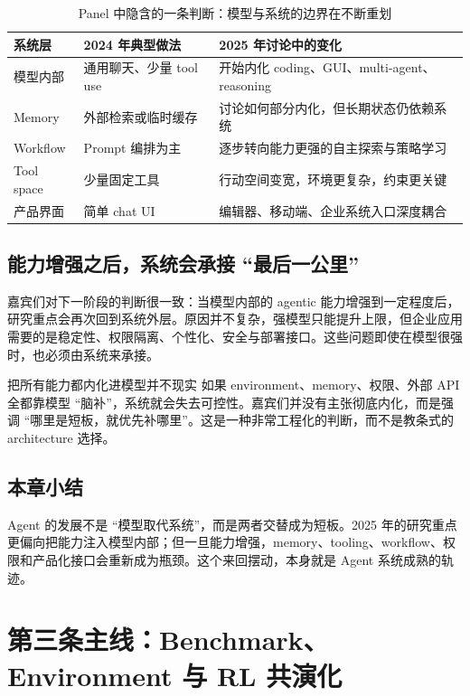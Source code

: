 \documentclass[a4paper]{article}
\begin{document}
\begin{table}[H]
\centering
\begin{tabular}{p{3.0cm}p{4.3cm}p{4.3cm}}
\toprule
\textbf{系统层} & \textbf{2024 年典型做法} & \textbf{2025 年讨论中的变化} \\
\midrule
模型内部 & 通用聊天、少量 tool use & 开始内化 coding、GUI、multi-agent、reasoning \\
Memory & 外部检索或临时缓存 & 讨论如何部分内化，但长期状态仍依赖系统 \\
Workflow & Prompt 编排为主 & 逐步转向能力更强的自主探索与策略学习 \\
Tool space & 少量固定工具 & 行动空间变宽，环境更复杂，约束更关键 \\
产品界面 & 简单 chat UI & 编辑器、移动端、企业系统入口深度耦合 \\
\bottomrule
\end{tabular}
\caption{Panel 中隐含的一条判断：模型与系统的边界在不断重划}
\end{table}

\subsection{能力增强之后，系统会承接 ``最后一公里''}
嘉宾们对下一阶段的判断很一致：当模型内部的 agentic 能力增强到一定程度后，研究重点会再次回到系统外层。原因并不复杂，强模型只能提升上限，但企业应用需要的是稳定性、权限隔离、个性化、安全与部署接口。这些问题即使在模型很强时，也必须由系统来承接。

\begin{warningbox}{把所有能力都内化进模型并不现实}
如果 environment、memory、权限、外部 API 全都靠模型 ``脑补''，系统就会失去可控性。嘉宾们并没有主张彻底内化，而是强调 ``哪里是短板，就优先补哪里''。这是一种非常工程化的判断，而不是教条式的 architecture 选择。
\end{warningbox}

\subsection{本章小结}
Agent 的发展不是 ``模型取代系统''，而是两者交替成为短板。2025 年的研究重点更偏向把能力注入模型内部；但一旦能力增强，memory、tooling、workflow、权限和产品化接口会重新成为瓶颈。这个来回摆动，本身就是 Agent 系统成熟的轨迹。

\section{第三条主线：Benchmark、Environment 与 RL 共演化}
\end{document}
